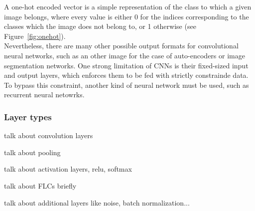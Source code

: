 A one-hot encoded vector is a simple representation of the class to which a
given image belongs, where every value is either 0 for the indices corresponding
to the classes which the image does not belong to, or 1 otherwise (see
Figure~\ref{fig:onehot}).\\

Nevertheless, there are many other possible output formats for convolutional
neural networks, such as an other image for the case of auto-encoders or image
segmentation networks. One strong limitation of CNNs is their fixed-sized
input and output layers, which enforces them to be fed with strictly
constrainde data. To bypass this constraint, another kind of neural network
must be used, such as recurrent neural netowrks.

	\subsubsection{Layer types}

talk about convolution layers

talk about pooling

talk about activation layers, relu, softmax

talk about FLCs briefly

talk about additional layers like noise, batch normalization...
